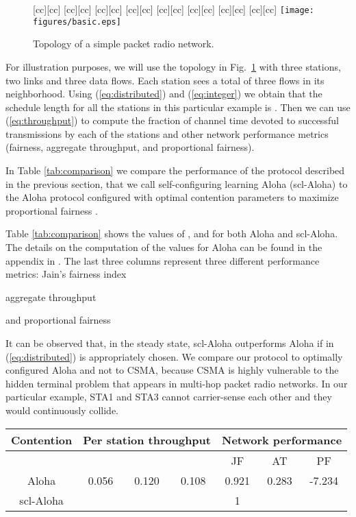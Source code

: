 \documentclass[twocolumn]{svjour3}          \smartqed  \usepackage{graphicx}
\begin{document}
\begin{figure}[]
[cc][cc]{}
[cc][cc]{}
[cc][cc]{}
[cc][cc]{}
[cc][cc]{}
[cc][cc]{}
[cc][cc]{}
[cc][cc]{}
\centering
\texttt{[image: figures/basic.eps]}
\caption{Topology of a simple packet radio network.}
\label{fig:basic}
\end{figure}

For illustration purposes, we will use the topology in Fig.~\ref{fig:basic} with three stations, two links and three data flows.
Each station sees a total of three flows in its neighborhood.
Using (\ref{eq:distributed}) and (\ref{eq:integer}) we obtain that the schedule length for all the stations in this particular example is \mbox{}.
Then we can use (\ref{eq:throughput}) to compute the fraction of channel time devoted to successful transmissions by each of the stations and other network performance metrics (fairness, aggregate throughput, and proportional fairness).

In Table \ref{tab:comparison} we compare the performance of the protocol described in the previous section, that we call self-configuring learning Aloha (scl-Aloha) to the Aloha protocol configured with optimal contention parameters to maximize proportional fairness \cite{kar2004apf}.

Table \ref{tab:comparison} shows the values of ,  and  for both Aloha and scl-Aloha.
The details on the computation of the values for Aloha can be found in the appendix in \cite{barcelo2011cfo}.
The last three columns represent three different performance metrics:
Jain's fairness index \cite{jain1991acs}

aggregate throughput

and proportional fairness \cite{kelly1997crc}

It can be observed that, in the steady state, scl-Aloha outperforms Aloha if  in (\ref{eq:distributed}) is appropriately chosen.
We compare our protocol to optimally configured Aloha and not to CSMA, because CSMA is highly vulnerable to the hidden terminal problem that appears in multi-hop packet radio networks.
In our particular example, STA1 and STA3 cannot carrier-sense each other and they would continuously collide.

\begin{table*}[]
\caption{Performance Comparison}
\label{tab:comparison}
\centering
\begin{tabular}{|c| |c|c|c|c|c|c|}
\hline
 Contention & \multicolumn{3}{|c|}{Per station throughput} & \multicolumn{3}{|c|}{Network performance}  \\
\hline
&  &  &  & JF & AT & PF \\
\hline
\hline
 Aloha & 0.056 & 0.120 & 0.108 & 0.921 & 0.283 & -7.234 \\
 scl-Aloha &  &  &  & 1 &  &  \\
\hline
\end{tabular}
\end{table*}
\end{document}
